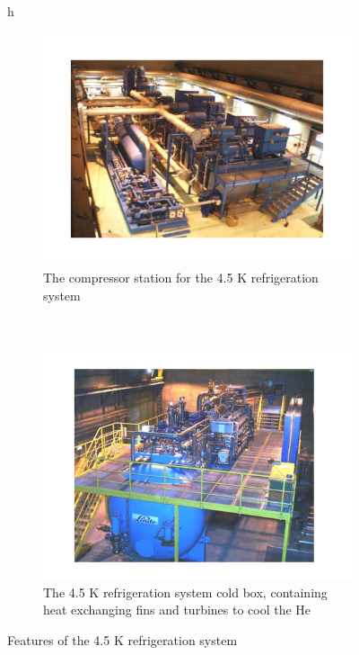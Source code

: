\begin{figure}{h}
    \centering
    \begin{subfigure}[h]{0.450\textwidth}
        \includegraphics[width=\textwidth]{Figures/LHC_Diagrams/LHC_Cryogen_4p5KFridgeCompressor.pdf}
        \caption{The compressor station for the 4.5 K refrigeration system}\label{fig:lhc_cryo_4p5_compressor}
      \end{subfigure}
      ~ %
    \begin{subfigure}[h]{0.450\textwidth}
        \includegraphics[width=\textwidth]{Figures/LHC_Diagrams/LHC_Cryogen4p5KFridge_Coldbox.pdf}
        \caption{The 4.5 K refrigeration system cold box, containing
          heat exchanging fins and turbines to cool the He}\label{fig:lhc_cryo_4p5_coldbox}
      \end{subfigure}
      \caption{Features of the 4.5 K refrigeration system \cite{LHC:LHC_cryogenicHe_system_Lebrun}}\label{fig:lhc_cryo_4p5}
\end{figure}


